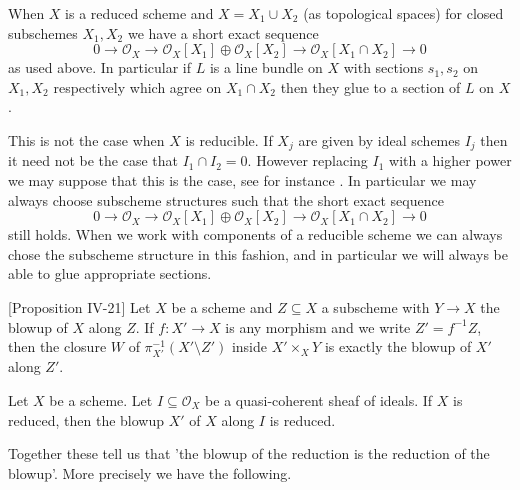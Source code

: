 \documentclass[a4paper,12pt]{book}
\newcommand{\ox}{\mathcal{O}_{X}}
\begin{document}
\begin{remark}\label{powers}
	
	When $X$ is a reduced scheme and $X=X_{1} \cup X_{2}$ (as topological spaces) for closed subschemes $X_{1},X_{2}$ we have a short exact sequence 
	\[0 \to \ox \to \ox[X_{1}]\oplus \ox[X_{2}] \to \ox[X_{1}\cap X_{2}] \to 0\]
	as used above. In particular if $L$ is a line bundle on $X$ with sections $s_{1},s_{2}$ on $X_{1},X_{2}$ respectively which agree on $X_{1}\cap X_{2}$ then they glue to a section of $L$ on $X$.
	
	This is not the case when $X$ is reducible. If $X_{j}$ are given by ideal schemes $I_{j}$ then it need not be the case that $I_{1} \cap I_{2} = 0$. However replacing $I_{1}$ with a higher power we may suppose that this is the case, see for instance \cite[Tag 01YC]{stacks-project}. In particular we may always choose subscheme structures such that the short exact sequence
	\[0 \to \ox \to \ox[X_{1}]\oplus \ox[X_{2}] \to \ox[X_{1}\cap X_{2}] \to 0\]
	still holds. When we work with components of a reducible scheme we can always chose the subscheme structure in this fashion, and in particular we will always be able to glue appropriate sections.
	
\end{remark}

\begin{lemma}\label{Blowup-close}\cite{eisenbud2000geometry}[Proposition IV-21]
	Let $X$ be a scheme and $Z \subseteq X$ a subscheme with $Y \to X$ the blowup of $X$ along $Z$. If $f:X' \to X$ is any morphism and we write $Z'=f^{-1}Z$, then the closure $W$ of $\pi_{X'}^{-1}(X'\setminus Z')$ inside $X' \times_{X} Y$ is exactly the blowup of $X'$ along $Z'$.
\end{lemma}

\begin{lemma}\label{Blowup-red}\cite[Tag 0808]{stacks-project}
	Let $X$ be a scheme. Let $I\subseteq \ox$ be a quasi-coherent sheaf of ideals. If $X$ is reduced, then the blowup $X'$ of $X$ along $I$ is reduced.
	
\end{lemma}

Together these tell us that 'the blowup of the reduction is the reduction of the blowup'. More precisely we have the following.
\end{document}
